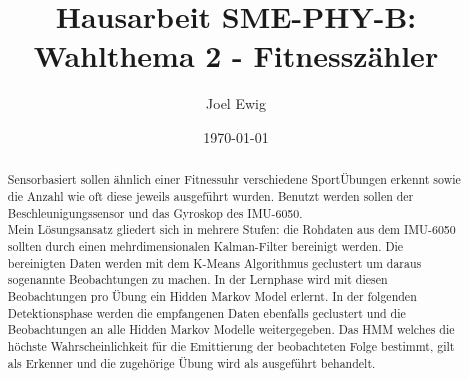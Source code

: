 \documentclass{article}
\begin{document}
\title{Hausarbeit SME-PHY-B: Wahlthema 2 - Fitnesszähler}
\author{Joel Ewig}
\date{\today}
\maketitle
\clearpage

\begin{abstract}
Sensorbasiert sollen ähnlich einer Fitnessuhr verschiedene SportÜbungen erkennt sowie die Anzahl wie oft diese jeweils ausgeführt wurden.
Benutzt werden sollen der Beschleunigungssensor und das Gyroskop des IMU-6050.\\
Mein Lösungsansatz gliedert sich in mehrere Stufen:
die Rohdaten aus dem IMU-6050 sollten durch einen mehrdimensionalen Kalman-Filter bereinigt werden.
Die bereinigten Daten werden mit dem K-Means Algorithmus geclustert um daraus sogenannte \glqq{}Beobachtungen\grqq{} zu machen.
In der Lernphase wird mit diesen Beobachtungen pro Übung ein Hidden Markov Model erlernt.
In der folgenden Detektionsphase werden die empfangenen Daten ebenfalls geclustert und die Beobachtungen an alle Hidden Markov Modelle weitergegeben.
Das HMM welches die höchste Wahrscheinlichkeit für die Emittierung der beobachteten Folge bestimmt, gilt als Erkenner und die zugehörige Übung wird als ausgeführt behandelt.
\end{abstract}
\clearpage

\tableofcontents
\clearpage
\end{document}
